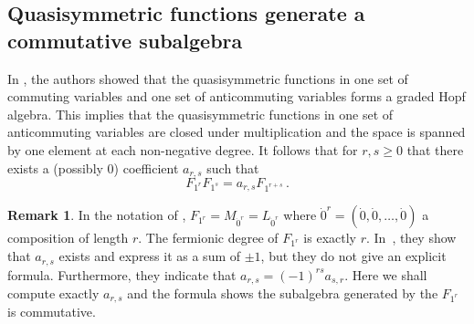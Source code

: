 \documentclass[11pt,oneside]{amsart}
\theoremstyle{definition}
\newtheorem{remark}[theorem]{Remark}
\numberwithin{equation}{section}
\begin{document}
\subsection{Quasisymmetric functions generate a commutative subalgebra}
In \cite{FLP}, the authors showed that the quasisymmetric functions in
one set of commuting variables and one set of anticommuting variables
forms a graded Hopf algebra.  This implies that the quasisymmetric functions
in one set of anticommuting variables are closed under multiplication
and the space is spanned by one element at each non-negative degree.
It follows that for $r, s \geq0$ that there exists a (possibly $0$)
coefficient $a_{r,s}$ such that
\begin{equation}\label{eq:qsalg}
F_{1^r} F_{1^s} = a_{r,s} F_{1^{r+s}}\,.
\end{equation}

\begin{remark}
In  the notation of \cite{FLP}, $F_{1^r}=M_{\dot{0}^r}=L_{\dot{0}^r}$ where $\dot{0}^r=(\dot{0},\dot{0},\ldots,\dot{0})$ a composition of length $r$.
The fermionic degree of $F_{1^r}$ is exactly $r$.
 In~\cite{FLP}, they show that $a_{r,s}$ exists and express it as a sum of $\pm 1$, but they do not give an explicit formula.
Furthermore, they indicate  that $a_{r,s}=(-1)^{rs}a_{s,r}$. Here we shall compute exactly $a_{r,s}$
and the formula shows the subalgebra generated by the $F_{1^r}$ is commutative.
\end{remark}
\end{document}
